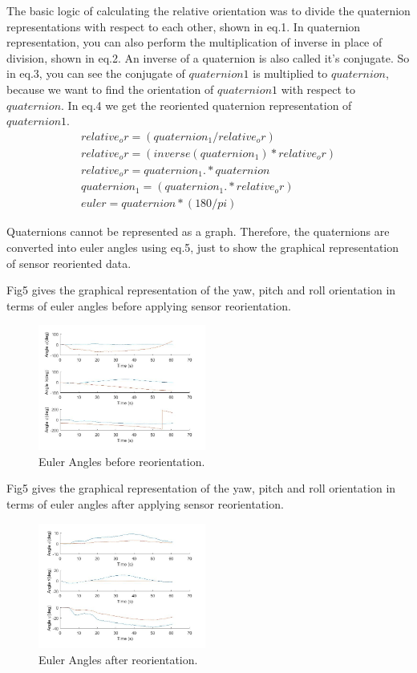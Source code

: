 \documentclass[journal]{IEEEtranTIE}
\begin{document}
The basic logic of calculating the relative orientation was to divide the quaternion representations with respect to each other, shown in eq.1. In quaternion representation, you can also perform the multiplication of inverse in place of division, shown in eq.2. An inverse of a quaternion is also called it's conjugate. So in eq.3, you can see the conjugate of $quaternion1$ is multiplied to $quaternion$, because we want to find the orientation of $quaternion1$ with respect to $quaternion$. In eq.4 we get the reoriented quaternion representation of $quaternion1$.
\begin{align}
  relative_or = (quaternion_1 / relative_or)\\
    relative_or = (inverse(quaternion_1) * relative_or)\\
  relative_or = quaternion_1.* quaternion\\
    quaternion_1 = (quaternion_1.* relative_or)\\
    euler=quaternion*(180/pi)
\end{align}

Quaternions cannot be represented as a graph. Therefore, the quaternions are converted into euler angles using eq.5, just to show the graphical representation of sensor reoriented data.

Fig5 gives the graphical representation of the yaw, pitch and roll orientation in terms of euler angles before applying sensor reorientation.
\begin{figure}[!t]\centering
  \includegraphics[width=5.5cm]{nonoriented}
  \caption{Euler Angles before reorientation.}\label{fig:fig4}
\end{figure}
Fig5 gives the graphical representation of the yaw, pitch and roll orientation in terms of euler angles after applying sensor reorientation.
\begin{figure}[!t]\centering
  \includegraphics[width=5.5cm]{orientd}
  \caption{Euler Angles after reorientation.}\label{fig:fig5}
\end{figure}
\end{document}
